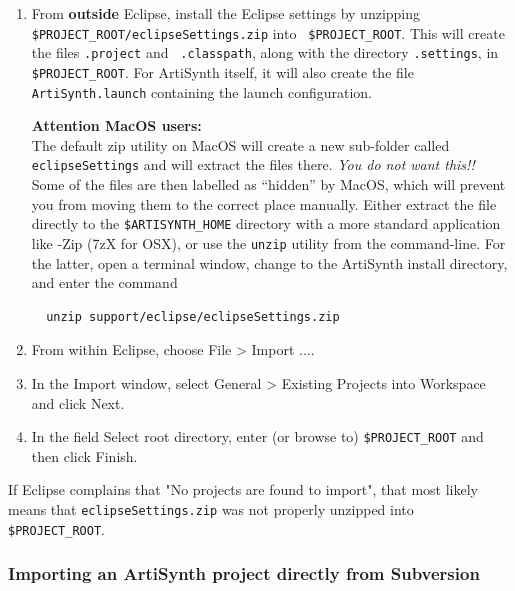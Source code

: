 \documentclass{article}
\def\SEP{/}
\def\directory{directory }
\begin{document}
\begin{enumerate}

\item From {\bf outside} Eclipse, install the Eclipse settings by
unzipping {\tt \$PROJECT\_ROOT\SEP eclipse\-Settings.zip} into {\tt
\$PROJECT\_ROOT}. This will create the files {\tt .project} and {\tt
.classpath}, along with the \directory {\tt .settings}, in {\tt
\$PROJECT\_ROOT}.  For ArtiSynth itself, it will also create the file
{\tt ArtiSynth.launch} containing the launch configuration.
  
\begin{sideblock}
{\bf Attention MacOS users:}\\[0.5em]
The default zip utility on MacOS will create a new sub-folder called 
{\tt eclipseSettings} and will extract the files there.  
\emph{You do not want this!!}
Some of the files are then labelled as ``hidden'' by MacOS, which will
prevent you from moving them to the correct place manually. 
Either extract the file directly to the {\tt\$ARTISYNTH\_HOME} directory 
with a more standard application like {-Zip} ({\sf 7zX} for OSX), 
or use the {\tt unzip} utility from the command-line.  For the latter,
open a terminal window, change to the ArtiSynth install directory,
and enter the command
\begin{verbatim}
  unzip support/eclipse/eclipseSettings.zip
\end{verbatim}
\end{sideblock}

\item From within Eclipse, choose {\sf File > Import ...}.

\item In the {\sf Import} window, select {\sf General > Existing Projects into
Workspace} and click {\sf Next}.

\item In the field {\sf Select root directory}, enter (or browse to) 
{\tt \$PROJECT\_ROOT} and then click {\sf Finish}. 

\end{enumerate}

If Eclipse complains that {\sf "No projects are found to import"}, that most
likely means that {\tt eclipseSettings.zip} was not
properly unzipped into {\tt \$PROJECT\_ROOT}.

\subsubsection{Importing an ArtiSynth project directly from Subversion}
\label{importingFromSubversion}
\end{document}
